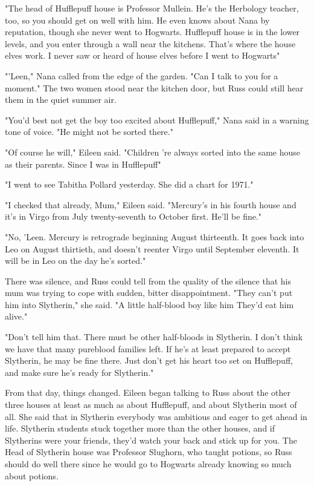 "The head of Hufflepuff house is Professor Mullein. He's the Herbology teacher, too, so you should get on well with him. He even knows about Nana by reputation, though she never went to Hogwarts. Hufflepuff house is in the lower levels, and you enter through a wall near the kitchens. That's where the house elves work. I never saw or heard of house elves before I went to Hogwarts{\el}"

"'Leen," Nana called from the edge of the garden. "Can I talk to you for a moment." The two women stood near the kitchen door, but Russ could still hear them in the quiet summer air.

"You'd best not get the boy too excited about Hufflepuff," Nana said in a warning tone of voice. "He might not be sorted there."

"Of course he will," Eileen said. "Children 're always sorted into the same house as their parents. Since I was in Hufflepuff{\el}"

"I went to see Tabitha Pollard yesterday. She did a chart for 1971."

"I checked that already, Mum," Eileen said. "Mercury's in his fourth house and it's in Virgo from July twenty-seventh to October first. He'll be fine."

"No, 'Leen. Mercury is retrograde beginning August thirteenth. It goes back into Leo on August thirtieth, and doesn't reenter Virgo until September eleventh. It will be in Leo on the day he's sorted."

There was silence, and Russ could tell from the quality of the silence that his mum was trying to cope with sudden, bitter disappointment. "They can't put him into Slytherin," she said. "A little half-blood boy like him{\el} They'd eat him alive."

"Don't tell him that. There must be other half-bloods in Slytherin. I don't think we have that many pureblood families left. If he's at least prepared to accept Slytherin, he may be fine there. Just don't get his heart too set on Hufflepuff, and make sure he's ready for Slytherin."

From that day, things changed. Eileen began talking to Russ about the other three houses at least as much as about Hufflepuff, and about Slytherin most of all. She said that in Slytherin everybody was ambitious and eager to get ahead in life. Slytherin students stuck together more than the other houses, and if Slytherins were your friends, they'd watch your back and stick up for you. The Head of Slytherin house was Professor Slughorn, who taught potions, so Russ should do well there since he would go to Hogwarts already knowing so much about potions.

